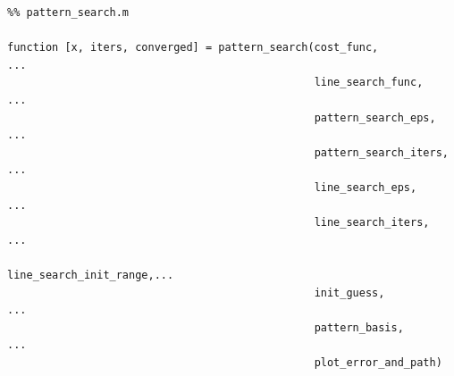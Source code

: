 \documentclass{article}
\begin{document}
\vspace{0.25in}
\begin{lstlisting}
%% pattern_search.m

function [x, iters, converged] = pattern_search(cost_func,             ... 
                                                line_search_func,      ...
                                                pattern_search_eps,    ...
                                                pattern_search_iters,  ...
                                                line_search_eps,       ...
                                                line_search_iters,     ...
                                                line_search_init_range,...
                                                init_guess,            ... 
                                                pattern_basis,         ...
                                                plot_error_and_path)


\end{lstlisting}
\end{document}
